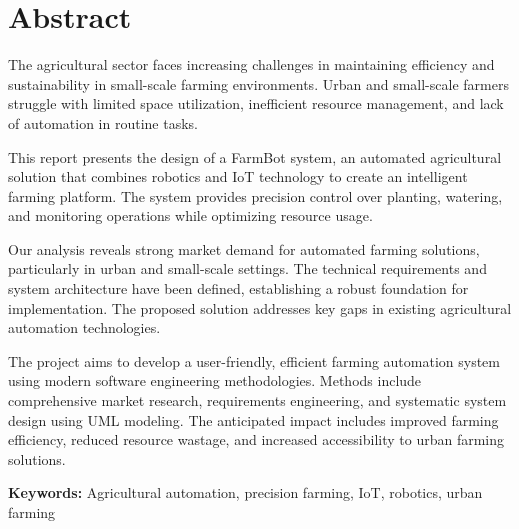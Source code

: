 \chapter*{Abstract}
\thispagestyle{empty}

The agricultural sector faces increasing challenges in maintaining efficiency and sustainability in small-scale farming environments. Urban and small-scale farmers struggle with limited space utilization, inefficient resource management, and lack of automation in routine tasks.

This report presents the design of a FarmBot system, an automated agricultural solution that combines robotics and IoT technology to create an intelligent farming platform. The system provides precision control over planting, watering, and monitoring operations while optimizing resource usage.

Our analysis reveals strong market demand for automated farming solutions, particularly in urban and small-scale settings. The technical requirements and system architecture have been defined, establishing a robust foundation for implementation. The proposed solution addresses key gaps in existing agricultural automation technologies.

The project aims to develop a user-friendly, efficient farming automation system using modern software engineering methodologies. Methods include comprehensive market research, requirements engineering, and systematic system design using UML modeling. The anticipated impact includes improved farming efficiency, reduced resource wastage, and increased accessibility to urban farming solutions.

\textbf{Keywords:} Agricultural automation, precision farming, IoT, robotics, urban farming
